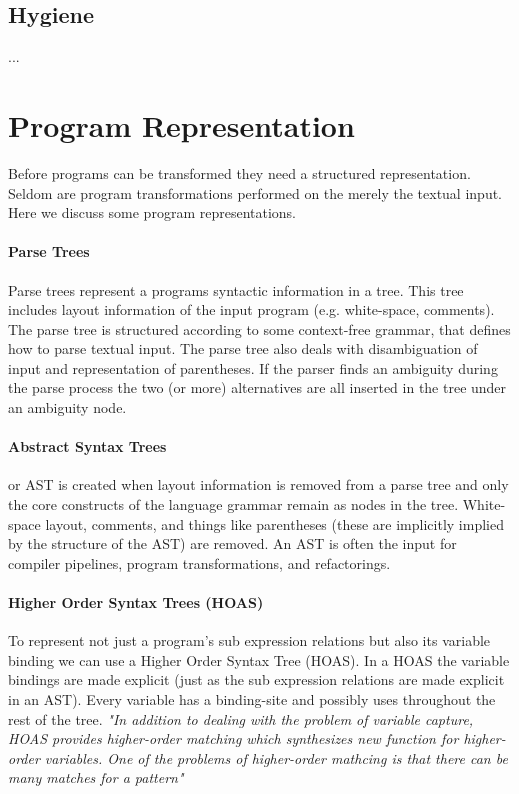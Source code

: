 \subsection{Hygiene} \label{hygiene}
...

\section{Program Representation} \label{program-representation}
Before programs can be transformed they need a structured representation. Seldom are program transformations performed on the merely the textual input. Here we discuss some program representations.

\paragraph{Parse Trees} 
Parse trees represent a programs syntactic information in a tree. This tree includes layout information of the input program (e.g. white-space, comments). The parse tree is structured according to some context-free grammar, that defines how to parse textual input. The parse tree also deals with disambiguation of input and representation of parentheses. If the parser finds an ambiguity during the parse process the two (or more) alternatives are all inserted in the tree under an ambiguity node.

\paragraph{Abstract Syntax Trees}
or AST is created when layout information is removed from a parse tree and only the core constructs of the language grammar remain as nodes in the tree. White-space layout, comments, and things like parentheses (these are implicitly implied by the structure of the AST) are removed. An AST is often the input for compiler pipelines, program transformations, and refactorings.

\paragraph{Higher Order Syntax Trees (HOAS)}
To represent not just a program's sub expression relations but also its variable binding we can use a Higher Order Syntax Tree (HOAS)\cite{Pfenning}. In a HOAS the variable bindings are made explicit (just as the sub expression relations are made explicit in an AST). Every variable has a binding-site and possibly uses throughout the rest of the tree. \textit{"In addition to dealing with the problem of variable capture, HOAS provides higher-order matching which synthesizes new function for higher-order  variables. One of the problems of higher-order mathcing is that there can be many matches for a pattern"}\cite{Visser2001}

